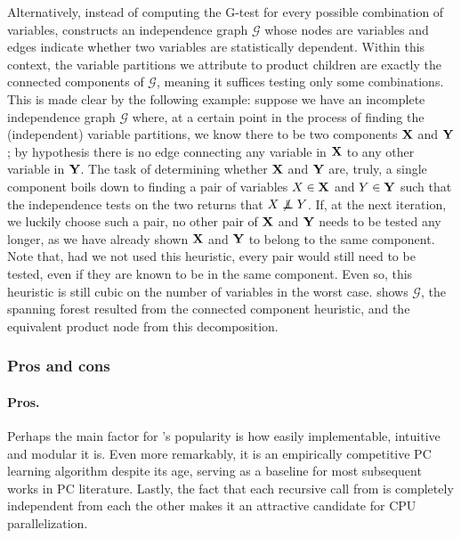 Alternatively, instead of computing the G-test for every possible combination of variables,
\citep{gens13} constructs an independence graph $\mathcal{G}$ whose nodes are variables and edges
indicate whether two variables are statistically dependent. Within this context, the variable
partitions we attribute to product children are exactly the connected components of $\mathcal{G}$,
meaning it suffices testing only some combinations. This is made clear by the following example:
suppose we have an incomplete independence graph $\mathcal{G}$ where, at a certain point in the
process of finding the (independent) variable partitions, we know there to be two components
$\mathbf{X}$ and $\mathbf{Y}$; by hypothesis there is no edge connecting any variable in $\mathbf{X}$ to any
other variable in $\mathbf{Y}$. The task of determining whether $\mathbf{X}$ and $\mathbf{Y}$ are, truly, a single
component boils down to finding a pair of variables $X\in\mathbf{X}$ and $Y\in\mathbf{Y}$ such that the
independence tests on the two returns that $X\not\indep Y$. If, at the next iteration, we luckily choose
such a pair, no other pair of $\mathbf{X}$ and $\mathbf{Y}$ needs to be tested any longer, as we have
already shown $\mathbf{X}$ and $\mathbf{Y}$ to belong to the same component. Note that, had we not used
this heuristic, every pair would still need to be tested, even if they are known to be in the same
component. Even so, this heuristic is still cubic on the number of variables in the worst case.
 shows $\mathcal{G}$, the spanning forest resulted from the connected
component heuristic, and the equivalent product node from this decomposition.

\subsubsection{Pros and cons}

\paragraph{Pros.} Perhaps the main factor for 's popularity is how easily
implementable, intuitive and modular it is. Even more remarkably, it is an empirically competitive
PC learning algorithm despite its age, serving as a baseline for most subsequent works in PC
literature. Lastly, the fact that each recursive call from  is completely
independent from each the other makes it an attractive candidate for CPU parallelization.

